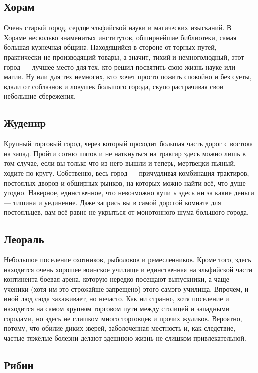 \documentclass[12pt,a4paper]{book}
\begin{document}
\subsection{Хорам}

Очень старый город, сердце эльфийской науки и магических изысканий. В Хораме несколько знаменитых институтов, обширнейшие библиотеки, самая большая кузнечная община. Находящийся в стороне от торных путей, практически не производящий товары, а значит, тихий и немноголюдный, этот город --- лучшее место для тех, кто решил посвятить свою жизнь науке или магии. Ну или для тех немногих, кто хочет просто пожить спокойно и без суеты, вдали от соблазнов и ловушек большого города, скупо растрачивая свои небольшие сбережения.

\subsection{Жуденир}

Крупный торговый город, через который проходит большая часть дорог с востока на запад. Пройти сотню шагов и не наткнуться на трактир здесь можно лишь в том случае, если вы только что из него вышли и теперь, мертвецки пьяный, ходите по кругу. Собственно, весь город --- причудливая комбинация трактиров, постоялых дворов и обширных рынков, на которых можно найти всё, что душе угодно. Наверное, единственное, что невозможно купить здесь ни за какие деньги --- тишина и уединение. Даже запрись вы в самой дорогой комнате для постояльцев, вам всё равно не укрыться от монотонного шума большого города.

\subsection{Леораль}

Небольшое поселение охотников, рыболовов и ремесленников. Кроме того, здесь находится очень хорошее воинское училище и единственная на эльфийской части континента боевая арена, которую нередко посещают выпускники, а чаще --- ученики (хотя им это строжайше запрещено) этого самого училища. Впрочем, и иной люд сюда захаживает, но нечасто. Как ни странно, хотя поселение и находится на самом крупном торговом пути между столицей и западными городами, но здесь не слишком много торговцев и прочих жуликов. Вероятно, потому, что обилие диких зверей, заболоченная местность и, как следствие, частые тяжёлые болезни делают здешнюю жизнь не слишком привлекательной.

\subsection{Рибин}
\end{document}
